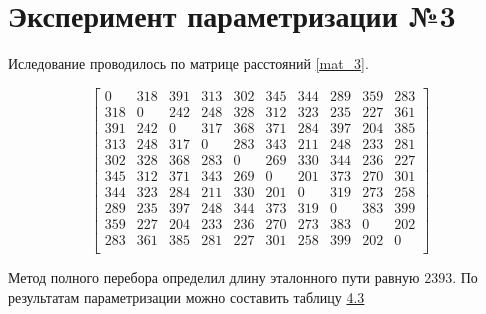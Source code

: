 \section {Эксперимент параметризации №3}
Иследование проводилось по матрице расстояний \ref{mat_3}. 
\begin{scriptsize} \begin{equation}\label{mat_3}
	\left[\begin{array}{cccccccccc}
		0 &     318 &   391 &   313 &   302 &   345 &   344 &   289 &   359 &   283 \\
		318 &   0 &     242 &   248 &   328 &   312 &   323 &   235 &   227 &   361 \\
		391 &   242 &   0 &     317 &   368 &   371 &   284 &   397 &   204 &   385 \\
		313 &   248 &   317 &   0 &     283 &   343 &   211 &   248 &   233 &   281 \\
		302 &   328 &   368 &   283 &   0 &     269 &   330 &   344 &   236 &   227 \\
		345 &   312 &   371 &   343 &   269 &   0 &     201 &   373 &   270 &   301 \\
		344 &   323 &   284 &   211 &   330 &   201 &   0 &     319 &   273 &   258 \\
		289 &   235 &   397 &   248 &   344 &   373 &   319 &   0 &     383 &   399 \\
		359 &   227 &   204 &   233 &   236 &   270 &   273 &   383 &   0 &     202 \\
		283 &   361 &   385 &   281 &   227 &   301 &   258 &   399 &   202 &   0 \\
	\end{array}\right]
\end{equation} \end{scriptsize}
Метод полного перебора определил длину эталонного пути равную $2393$. По результатам параметризации  можно составить таблицу \hyperref[table_4_3]{4.3}

